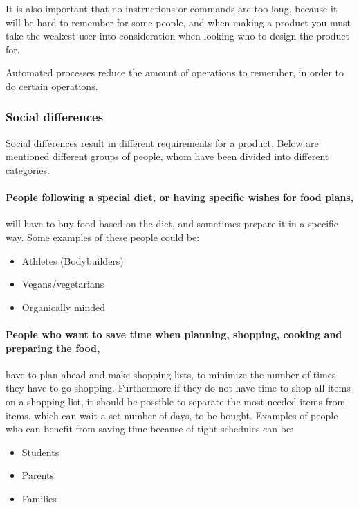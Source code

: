 It is also important that no instructions or commands are too long, because it will be hard to remember for some people, and when making a product you must take the weakest user into consideration when looking who to design the product for.

Automated processes reduce the amount of operations to remember, in order to do certain operations.

\subsubsection{Social differences}
Social differences result in different requirements for a product. Below are mentioned different groups of people, whom have been divided into different categories.

\paragraph{People following a special diet, or having specific wishes for food plans,}
will have to buy food based on the diet, and sometimes prepare it in a specific way. Some examples of these people could be:
\begin{itemize}
\item Athletes (Bodybuilders)
\item Vegans/vegetarians
\item Organically minded
\end{itemize}

\paragraph{People who want to save time when planning, shopping, cooking and preparing the food,}
have to plan ahead and make shopping lists, to minimize the number of times they have to go shopping. Furthermore if they do not have time to shop all items on a shopping list, it should be possible to separate the most needed items from items, which can wait a set number of days, to be bought. Examples of people who can benefit from saving time because of tight schedules can be:
\begin{itemize}
\item Students
\item Parents
\item Families
\end{itemize}


